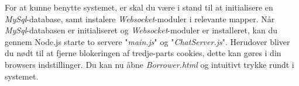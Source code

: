 For at kunne benytte systemet, er skal du være i stand til at initialisere en \textit{MySql}-database, samt instalere \textit{Websocket}-moduler i relevante mapper. Når  \textit{MySql}-databasen er initialiseret og \textit{Websocket}-moduler er installeret, kan du gennem Node.js starte to servere "\textit{main.js}" og "\textit{ChatServer.js}". Herudover bliver du nødt til at fjerne blokeringen af tredje-parts cookies, dette kan gøres i din browsers indstillinger. Du kan nu åbne \textit{Borrower.html} og intuitivt trykke rundt i systemet.
